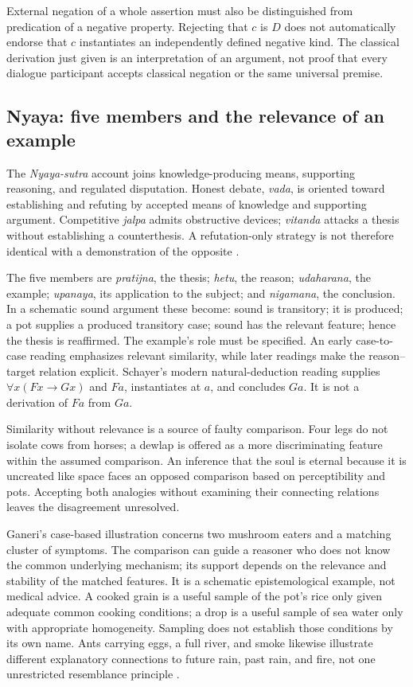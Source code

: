 External negation of a whole assertion must also be distinguished from
predication of a negative property. Rejecting that \(c\) is \(D\) does not
automatically endorse that \(c\) instantiates an independently defined
negative kind. The classical derivation just given is an interpretation of
an argument, not proof that every dialogue participant accepts classical
negation or the same universal premise.

\subsection{Nyaya: five members and the relevance of an example}

The \emph{Nyaya-sutra} account joins knowledge-producing means, supporting
reasoning, and regulated disputation. Honest debate, \emph{vada}, is oriented
toward establishing and refuting by accepted means of knowledge and supporting
argument. Competitive \emph{jalpa} admits obstructive devices; \emph{vitanda}
attacks a thesis without establishing a counterthesis. A refutation-only
strategy is not therefore identical with a demonstration of the opposite
\cite[pp.~321--334]{Ganeri2004IndianLogicPublished}.

The five members are \emph{pratijna}, the thesis; \emph{hetu}, the reason;
\emph{udaharana}, the example; \emph{upanaya}, its application to the subject;
and \emph{nigamana}, the conclusion. In a schematic sound argument these become:
sound is transitory; it is produced; a pot supplies a produced transitory
case; sound has the relevant feature; hence the thesis is reaffirmed.
The example's role must be specified. An early case-to-case reading emphasizes
relevant similarity, while later readings make the reason--target relation
explicit. Schayer's modern natural-deduction reading supplies
\(\forall x(Fx\to Gx)\) and \(Fa\), instantiates at \(a\), and concludes
\(Ga\). It is not a derivation of \(Fa\) from \(Ga\).

Similarity without relevance is a source of faulty comparison. Four legs
do not isolate cows from horses; a dewlap is offered as a more discriminating
feature within the assumed comparison. An inference that the soul is eternal
because it is uncreated like space faces an opposed comparison based on
perceptibility and pots. Accepting both analogies without examining their
connecting relations leaves the disagreement unresolved.

Ganeri's case-based illustration concerns two mushroom eaters and a matching
cluster of symptoms. The comparison can guide a reasoner who does not know
the common underlying mechanism; its support depends on the relevance and
stability of the matched features. It is a schematic epistemological example,
not medical advice. A cooked grain is a useful sample of the pot's rice only
given adequate common cooking conditions; a drop is a useful sample of sea
water only with appropriate homogeneity. Sampling does not establish those
conditions by its own name. Ants carrying eggs, a full river, and smoke
likewise illustrate different explanatory connections to future rain,
past rain, and fire, not one unrestricted resemblance principle
\cite[pp.~324--329]{Ganeri2004IndianLogicPublished}.

